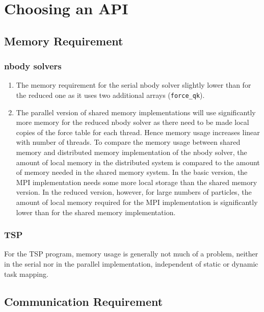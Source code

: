 \documentclass[a4paper,11pt,twoside]{article}
\begin{document}
\section{Choosing an API}
\subsection{Memory Requirement}
\subsubsection{nbody solvers}
\begin{enumerate}
\item The memory requirement for the serial nbody solver slightly lower than for the reduced one as it uses two additional arrays (\verb+force_qk+).
\item The parallel version of shared memory implementations will use significantly more memory for the reduced  nbody solver as there need to be made local copies of the force table for each thread. Hence memory usage increases linear with number of threads. To compare the memory usage between shared memory and distributed memory implementation of the nbody solver, the amount of local memory in the distributed system is compared to the amount of memory needed in the shared memory system. 
In the basic version, the MPI implementation needs some more local storage than the shared memory version. In the reduced version, however, for large numbers of particles, the amount of local memory required for the MPI implementation is significantly lower than for the shared memory implementation.
\end{enumerate}
\subsubsection{TSP}
For the TSP program, memory usage is generally not much of a problem, neither in the serial nor in the parallel implementation, independent of static or dynamic task mapping.  
\subsection{Communication Requirement}
\end{document}
